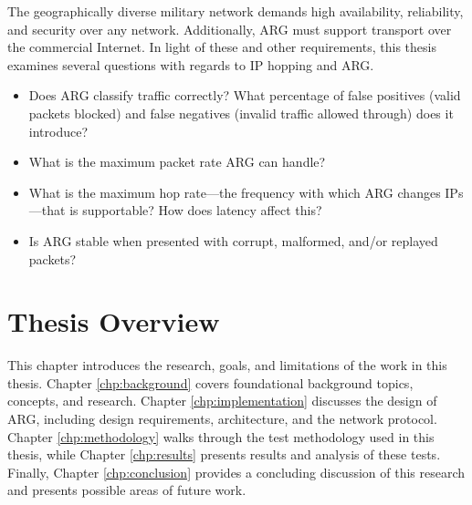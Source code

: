 \par The geographically diverse military network demands high availability, reliability, and security over any network. Additionally, \ac{ARG} must support transport over the commercial Internet. In light of these and other requirements, this thesis examines several questions with regards to \ac{IP} hopping and \ac{ARG}.
\begin{itemize}
	\item Does \ac{ARG} classify traffic correctly? What percentage of false positives (valid packets blocked) and false negatives (invalid traffic allowed through) does it introduce?
	\item What is the maximum packet rate \ac{ARG} can handle?
	\item What is the maximum hop rate---the frequency with which \ac{ARG} changes \acp{IP}---that is supportable? How does latency affect this?
	\item Is \ac{ARG} stable when presented with corrupt, malformed, and/or replayed packets?
\end{itemize}



\section{Thesis Overview}
\par This chapter introduces the research, goals, and limitations of the work in this thesis. Chapter \ref{chp:background} covers foundational background topics, concepts, and research. Chapter \ref{chp:implementation} discusses the design of \ac{ARG}, including design requirements, architecture, and the network protocol. Chapter \ref{chp:methodology} walks through the test methodology used in this thesis, while Chapter \ref{chp:results} presents results and analysis of these tests. Finally, Chapter \ref{chp:conclusion} provides a concluding discussion of this research and presents possible areas of future work.

